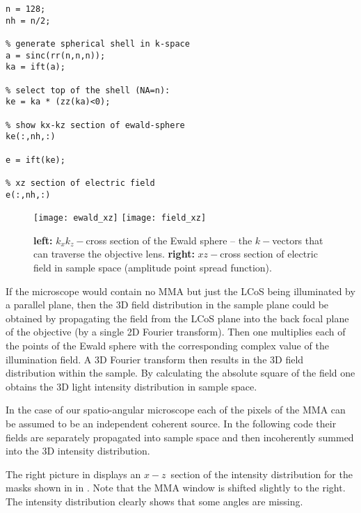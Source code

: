 {\small
\begin{verbatim}
n = 128;
nh = n/2;

% generate spherical shell in k-space
a = sinc(rr(n,n,n));
ka = ift(a);

% select top of the shell (NA=n):
ke = ka * (zz(ka)<0);

% show kx-kz section of ewald-sphere
ke(:,nh,:)

e = ift(ke);

% xz section of electric field
e(:,nh,:)
\end{verbatim}

\begin{figure}[!hbt]
  \centering
  \texttt{[image: ewald\_xz]}
  \quad\quad
  \texttt{[image: field\_xz]}
  \caption{{\bf left:} $k_xk_z-$cross section of the Ewald sphere --
    the $k-$vectors that can traverse the objective lens. {\bf right:}
    $xz-$cross section of electric field in sample space (amplitude
    point spread function).}
  \label{fig:simple-apsf}
\end{figure}

If the microscope would contain no MMA but just the LCoS being
illuminated by a parallel plane, then the 3D field distribution in the
sample plane could be obtained by propagating the field from the LCoS
plane into the back focal plane of the objective (by a single 2D
Fourier transform). Then one multiplies each of the points of the
Ewald sphere with the corresponding complex value of the illumination
field. A 3D Fourier transform then results in the 3D field
distribution within the sample. By calculating the absolute square of
the field one obtains the 3D light intensity distribution in sample
space.

In the case of our spatio-angular microscope each of the pixels of the
MMA can be assumed to be an independent coherent source. In the
following code their fields are separately propagated into sample
space and then incoherently summed into the 3D intensity distribution.

The right picture in  displays an
$x-z$~section of the intensity distribution for the masks shown in in
. Note that the MMA window is shifted
slightly to the right. The intensity distribution clearly shows that
some angles are missing.

}
